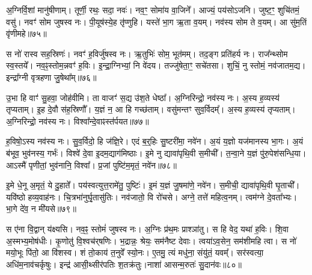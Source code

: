 अ॒ग्निर्वि॒शां मानु॑षीणाम्।
तूर्णी॒ रथः॒ सदा॒ नवः॑।
नव॒ꣳ॒ सोमा॑य वा॒जिने᳚।
आज्यं॒ पय॑सोऽजनि।
जुष्ट॒ꣳ॒ शुचि॑तमं॒ वसु॑।
नवꣳ॑ सोम जुषस्व नः।
पी॒यूष॑स्ये॒ह तृ॑प्णुहि।
यस्ते॑ भा॒ग ऋ॒ता व॒यम्।
नव॑स्य सोम ते व॒यम्।
आ सु॑म॒तिं वृ॑णीमहे॥७५॥\ip

स नो॑ रास्व सह॒स्रिणः॑।
नवꣳ॑ ह॒विर्जु॑षस्व नः।
ऋ॒तुभिः॑ सोम॒ भूत॑मम्।
तद॒ङ्ग प्रति॑\-हर्य नः।
राज᳚न्थ्सोम स्व॒स्तये᳚।
नव॒ꣴ॒स्तोम॒न्नवꣳ॑ ह॒विः।
इ॒न्द्रा॒ग्निभ्यां॒ नि वे॑दय।
तज्जु॑षेता॒ꣳ॒ सचे॑तसा।
शुचिं॒ नु स्तोमं॒ नव॑जातम॒द्य।
इन्द्रा᳚ग्नी वृत्रहणा जु॒षेथा᳚म्॥७६॥\ip

उ॒भा हि वाꣳ॑ सु॒हवा॒ जोह॑वीमि।
ता वाजꣳ॑ स॒द्य उ॑श॒ते धेष्ठा᳚।
अ॒ग्निरिन्द्रो॒ नव॑स्य नः।
अ॒स्य ह॒व्यस्य॑ तृप्यताम्।
इ॒ह दे॒वौ स॑ह॒स्रिणौ᳚।
य॒ज्ञं न॒ आ हि गच्छ॑ताम्।
वसु॑मन्तꣳ सुव॒र्विदम्᳚।
अ॒स्य ह॒व्यस्य॑ तृप्यताम्।
अ॒ग्निरिन्द्रो॒ नव॑स्य नः।
विश्वा᳚न्दे॒वाꣴस्त॑र्पयत॥७७॥\ip

ह॒विषो॒ऽस्य नव॑स्य नः।
सु॒व॒र्विदो॒ हि ज॑ज्ञि॒रे।
एदं ब॒र्॒हिः सु॒ष्टरी॑मा॒ नवे॑न।
अ॒यं य॒ज्ञो यज॑मानस्य भा॒गः।
अ॒यं ब॑भूव॒ भुव॑नस्य॒ गर्भः॑।
विश्वे॑ दे॒वा इ॒दम॒द्याग॑मिष्ठाः।
इ॒मे नु द्यावा॑पृथि॒वी स॒मीची᳚।
त॒न्वा॒ने य॒ज्ञं पु॑रु॒पेश॑सन्धि॒या।
आऽस्मै॑ पृणीतां॒ भुव॑नानि॒ विश्वा᳚।
प्र॒जां पुष्टि॑म॒मृतं॒ नवे॑न॥७८॥\ip

इ॒मे धे॒नू अ॒मृतं॒ ये दु॒हाते᳚।
पय॑स्वत्युत्त॒रामे॑तु॒ पुष्टिः॑।
इ॒मं य॒ज्ञं जु॒षमा॑णे॒ नवे॑न।
स॒मीची॒ द्यावा॑पृथि॒वी घृ॒ताची᳚।
यवि॑ष्ठो हव्य॒वाह॑नः।
चि॒त्रभा॑नुर्घृ॒तासु॑तिः।
नव॑जातो॒ वि रो॑चसे।
अग्ने॒ तत्ते॑ महित्व॒नम्।
त्वम॑ग्ने दे॒वता᳚भ्यः।
भा॒गे दे॑व॒ न मी॑यसे॥७९॥\ip

स ए॑ना वि॒द्वान् य॑क्ष्यसि।
नव॒ꣴ॒ स्तोमं॑ जुषस्व नः।
अ॒ग्निः प्र॑थ॒मः प्राश्ञा॑तु।
स हि वेद॒ यथा॑ ह॒विः।
शि॒वा अ॒स्मभ्य॒मोष॑धीः।
कृ॒णोतु॑ वि॒श्वच॑र्‌\mbox{}षणिः।
भ॒द्रान्नः॒ श्रेयः॒ सम॑नैष्ट देवाः।
त्वया॑\-ऽव॒सेन॒ सम॑शीमहि त्वा।
स नो॑ मयो॒भूः पि॑तो॒ आ वि॑शस्व।
शं तो॒काय॑ त॒नुवे᳚ स्यो॒नः।
ए॒तमु॒ त्यं मधु॑ना॒ संयु॑तं॒ यवम्᳚।
सर॑स्वत्या॒ अधि॑म॒नाव॑चर्कृषुः।
इन्द्र॑ आसी॒थ्सीर॑पतिः श॒तक्र॑तुः।नाशा॑ आसन्म॒रुतः॑ सु॒दान॑वः॥८०॥\ip\anuvakamend[पु॒र॒ए॒ता वृ॑णीमहे जु॒षेथा᳚न्तर्पयता॒मृत॒न्नवे॑न मीयसे स्यो॒नश्च॒त्वारि॑ च]


\clearpage
{}
\setcounter{anuvakam}{0}

